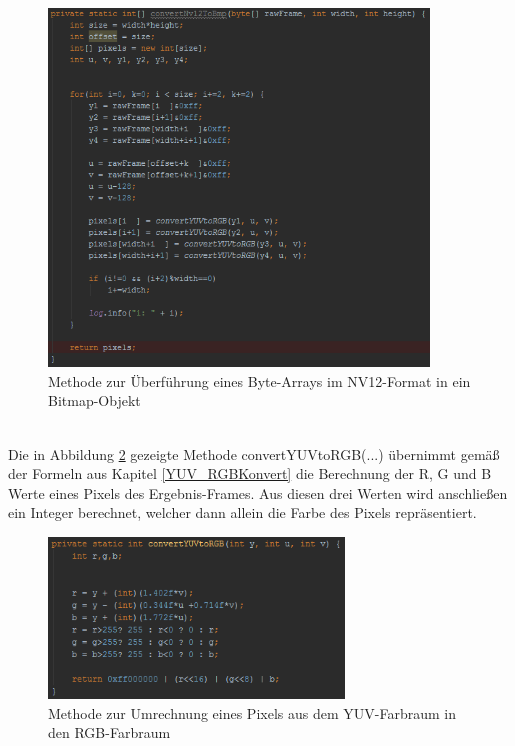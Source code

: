 \begin{figure}[h]
	\centering
	\includegraphics[width=0.9\textwidth]{Bilder/Bildverarbeitung/NV12_to_BMP.PNG}
	\caption{Methode zur Überführung eines Byte-Arrays im NV12-Format in ein Bitmap-Objekt}
	\label{fig:NV12_to_BMP}
\end{figure}

~\\
Die in Abbildung \ref{fig:YUV_to_RGB} gezeigte Methode convertYUVtoRGB(...) übernimmt gemäß der Formeln aus Kapitel \ref{YUV_RGBKonvert} die Berechnung der R, G und B Werte eines Pixels des Ergebnis-Frames. Aus diesen drei Werten wird anschließen ein Integer berechnet, welcher dann allein die Farbe des Pixels repräsentiert.
\clearpage
\begin{figure}[h]
	\centering
	\includegraphics[width=0.7\textwidth]{Bilder/Bildverarbeitung/convert_1_Pixel.PNG}
	\caption{Methode zur Umrechnung eines Pixels aus dem YUV-Farbraum in den RGB-Farbraum}
	\label{fig:YUV_to_RGB}
\end{figure}
